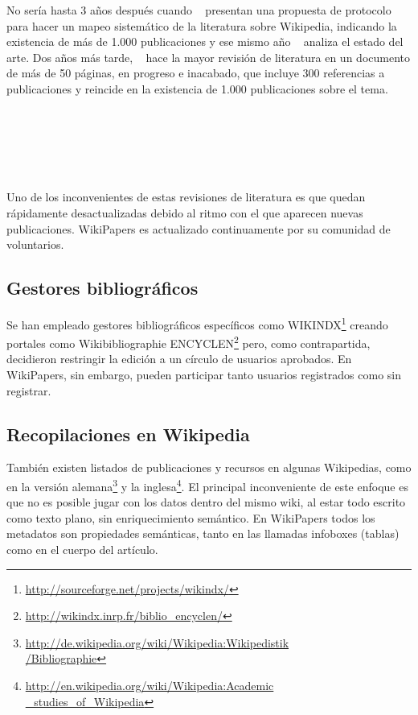 \documentclass[11pt,twocolumn]{article}
\begin{document}
No sería hasta 3 años después cuando ~\citep{okoli2009b} presentan una propuesta de protocolo para hacer un mapeo sistemático de la literatura sobre Wikipedia, indicando la existencia de más de 1.000 publicaciones y ese mismo año ~\citep{okoli2009} analiza el estado del arte. Dos años más tarde, ~\citep{nielsen2011} hace la mayor revisión de literatura en un documento de más de 50 páginas, en progreso e inacabado, que incluye 300 referencias a publicaciones y reincide en la existencia de 1.000 publicaciones sobre el tema.

~\citep{martin2011}

~\citep{okoli2012}

~\citep{jullien2012}

Uno de los inconvenientes de estas revisiones de literatura es que quedan rápidamente desactualizadas debido al ritmo con el que aparecen nuevas publicaciones. WikiPapers es actualizado continuamente por su comunidad de voluntarios.

\subsection{Gestores bibliográficos}
Se han empleado gestores bibliográficos específicos como WIKINDX\footnote{\href{http://sourceforge.net/projects/wikindx/}{http://sourceforge.net/projects/wikindx/}} creando portales como Wikibibliographie ENCYCLEN\footnote{\href{http://wikindx.inrp.fr/biblio_encyclen/}{http://wikindx.inrp.fr/biblio\_encyclen/}} pero, como contrapartida, decidieron restringir la edición a un círculo de usuarios aprobados. En WikiPapers, sin embargo, pueden participar tanto usuarios registrados como sin registrar.


\subsection{Recopilaciones en Wikipedia}
También existen listados de publicaciones y recursos en algunas Wikipedias, como en la versión alemana\footnote{\href{http://de.wikipedia.org/wiki/Wikipedia:Wikipedistik/Bibliographie}{http://de.wikipedia.org/wiki/Wikipedia:Wikipedistik\\ /Bibliographie}} y la inglesa\footnote{\href{http://en.wikipedia.org/wiki/Wikipedia:Academic_studies_of_Wikipedia}{http://en.wikipedia.org/wiki/Wikipedia:Academic\\ \_studies\_of\_Wikipedia}}. El principal inconveniente de este enfoque es que no es posible jugar con los datos dentro del mismo wiki, al estar todo escrito como texto plano, sin enriquecimiento semántico. En WikiPapers todos los metadatos son propiedades semánticas, tanto en las llamadas infoboxes (tablas) como en el cuerpo del artículo.
\end{document}
